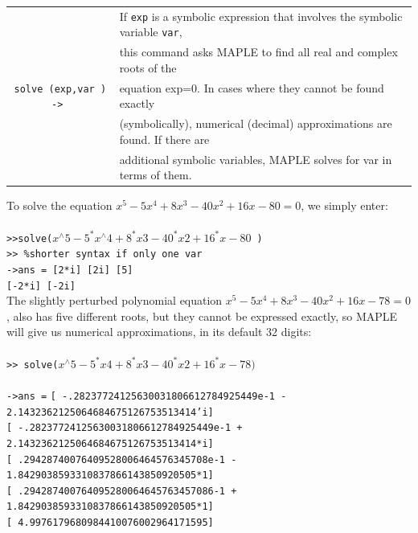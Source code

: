 \documentclass[../main.tex]{subfiles}
\begin{document}
\begin{center}
\begin{tabular}{|c|l|}
\hline
&If \texttt{exp} is a symbolic expression that involves the symbolic variable \texttt{var},\\
&this command asks MAPLE to find all real and complex roots of the\\
\texttt{solve (exp,var ) -> }&equation exp=0. In cases where they cannot be found exactly\\
&(symbolically), numerical (decimal) approximations are found. If there are\\
& additional symbolic variables, MAPLE solves for var in terms of them.\\
\hline
\end{tabular}
\end{center}
To solve the equation $x^{5}-5 x^{4}+8 x^{3}-40 x^{2}+16 x-80=0$, we simply enter:
\\
\\
\texttt{>>solve($x^{\wedge}5-5^*x^{\wedge}4+8^*x 3-40^*x 2+16^*x-80$ ) }\\
\texttt{>> \%shorter syntax if only one var }\\
\texttt{->ans = [2*i] [2i] [5]}\\
\texttt{[-2*i] [-2i] }\\
The slightly perturbed polynomial equation $x^{5}-5 x^{4}+8 x^{3}-40 x^{2}+16 x-78=0$, also has five different roots, but they cannot be expressed exactly, so MAPLE will give us numerical approximations, in its default 32 digits:\\
\\
\texttt{>> solve($x^{\wedge}5-5^*x 4+8^*x 3-40^*x 2+16^*x-78) $}\\
\\
\texttt{->ans =}
\texttt{[ -.28237724125630031806612784925449e-1 -}\\
\texttt{2.1432362125064684675126753513414'i]}\\
\texttt{[ -.28237724125630031806612784925449e-1 + }\\
\texttt{2.1432362125064684675126753513414*i]}\\
\texttt{[ .29428740076409528006464576345708e-1 -}\\
\texttt{1.8429038593310837866143850920505*1] }\\
\texttt{[ .294287400764095280064645763457086-1 + }\\
\texttt{1.8429038593310837866143850920505*1] }\\
\texttt{[ 4.9976179680984410076002964171595] }
\end{document}
